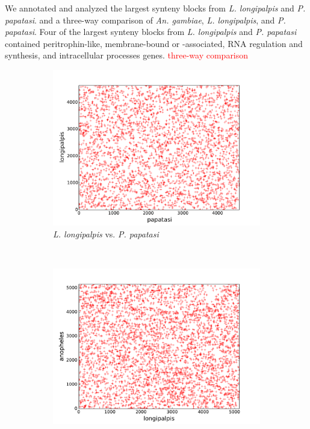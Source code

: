 We annotated and analyzed the largest synteny blocks from \emph{L. longipalpis} and \emph{P. papatasi}. and a three-way comparison of \emph{An. gambiae}, \emph{L. longipalpis}, and \emph{P. papatasi}.  Four of the largest synteny blocks from \emph{L. longipalpis} and \emph{P. papatasi} contained peritrophin-like, membrane-bound or -associated, RNA regulation and synthesis, and intracellular processes genes. \textcolor{red}{three-way comparison}

\begin{figure}[H]
  \centering
  \begin{subfigure}[b]{0.45\textwidth}
    \includegraphics[width=\textwidth]{figures/synteny/papatasi_longipalpis_plot}
    \caption{\emph{L. longipalpis} vs. \emph{P. papatasi}}
    \label{fig:synteny-dotplots-sandflies}
  \end{subfigure}
  \\
  \begin{subfigure}[b]{0.45\textwidth}
    \includegraphics[width=\textwidth]{figures/synteny/longipalpis_anopheles_plot}

\end{subfigure}
\end{figure}
